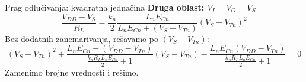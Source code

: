 \begin{frame}[label=09_1-s024]{Prag odlučivanja: kvadratna jednačina}\setlength{\parskip}{2pt}\setlength{\abovedisplayskip}{4pt}\setlength{\belowdisplayskip}{4pt}\setlength{\abovedisplayshortskip}{3pt}\setlength{\belowdisplayshortskip}{3pt}
\textbf{Druga oblast; $V_I=V_O=V_S$}\[\frac{V_{DD}-V_S}{R_L}=\frac{k_n}{2}\frac{L_nE_{Cn}}{L_nE_{Cn}+(V_S-V_{Tn})}(V_S-V_{Tn})^2\]
Bez dodatnih zanemarivanja, rešavamo po $(V_S-V_{Tn})$:
\[(V_S-V_{Tn})^2+\frac{L_nE_{Cn}-(V_{DD}-V_{Tn})}{\frac{k_nR_LL_nE_{Cn}}2+1}(V_S-V_{Tn})-\frac{L_nE_{Cn}(V_{DD}-V_{Tn})}{\frac{k_nR_LL_nE_{Cn}}2+1}=0\]
\medskip Zamenimo brojne vrednosti i rešimo.
\end{frame}
